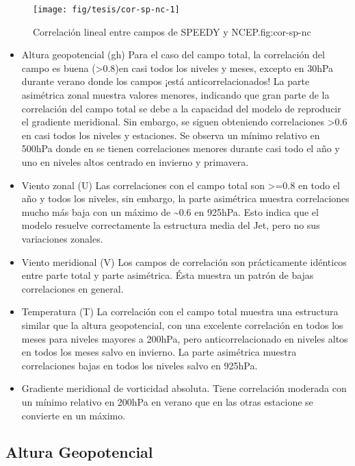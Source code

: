 \documentclass[spanish,a4paper]{book}
\begin{document}
\begin{figure}
\texttt{[image: fig/tesis/cor-sp-nc-1]} \caption{Correlación lineal entre campos de SPEEDY y NCEP.{fig:cor-sp-nc}}\label{fig:cor-sp-nc}
\end{figure}

\begin{itemize}
\item
  Altura geopotencial (gh) Para el caso del campo total, la correlación
  del campo es buena (\textgreater{}0.8)en casi todos los niveles y
  meses, excepto en 30hPa durante verano donde los campos ¡está
  anticorrelacionados! La parte asimétrica zonal muestra valores
  menores, indicando que gran parte de la correlación del campo total se
  debe a la capacidad del modelo de reproducir el gradiente meridional.
  Sin embargo, se siguen obteniendo correlaciones \textgreater{}0.6 en
  casi todos los niveles y estaciones. Se observa un mínimo relativo en
  500hPa donde en se tienen correlaciones menores durante casi todo el
  año y uno en niveles altos centrado en invierno y primavera.
\item
  Viento zonal (U) Las correlaciones con el campo total son
  \textgreater{}=0.8 en todo el año y todos los niveles, sin embargo, la
  parte asimétrica muestra correlaciones mucho más baja con un máximo de
  \textasciitilde{}0.6 en 925hPa. Esto indica que el modelo resuelve
  correctamente la estructura media del Jet, pero no sus variaciones
  zonales.
\item
  Viento meridional (V) Los campos de correlación son prácticamente
  idénticos entre parte total y parte asimétrica. Ésta muestra un patrón
  de bajas correlaciones en general.
\item
  Temperatura (T) La correlación con el campo total muestra una
  estructura similar que la altura geopotencial, con una excelente
  correlación en todos los meses para niveles mayores a 200hPa, pero
  anticorrelacionado en niveles altos en todos los meses salvo en
  invierno. La parte asimétrica muestra correlaciones bajas en todos los
  niveles salvo en 925hPa.
\item
  Gradiente meridional de vorticidad absoluta. Tiene correlación
  moderada con un mínimo relativo en 200hPa en verano que en las otras
  estacione se convierte en un máximo.
\end{itemize}

\subsection{Altura Geopotencial}\label{altura-geopotencial-1}
\end{document}
